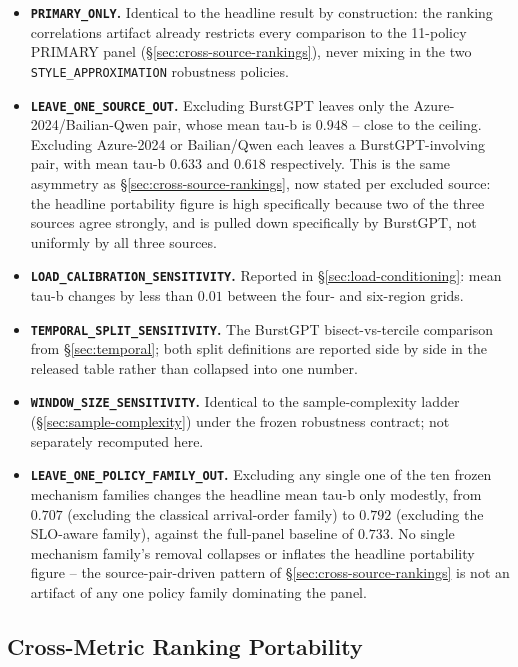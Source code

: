 \documentclass[sn-basic,Numbered,pdflatex]{sn-jnl}
\begin{document}
\begin{itemize}
  \item \textbf{\texttt{PRIMARY\_ONLY}.} Identical to the headline result
    by construction: the ranking correlations artifact already restricts
    every comparison to the 11-policy PRIMARY panel
    (\S\ref{sec:cross-source-rankings}), never mixing in the two
    \texttt{STYLE\_APPROXIMATION} robustness policies.
  \item \textbf{\texttt{LEAVE\_ONE\_SOURCE\_OUT}.} Excluding BurstGPT
    leaves only the Azure-2024/Bailian-Qwen pair, whose mean tau-b is
    $0.948$ -- close to the ceiling. Excluding Azure-2024 or Bailian/Qwen
    each leaves a BurstGPT-involving pair, with mean tau-b $0.633$ and
    $0.618$ respectively. This is the same asymmetry as
    \S\ref{sec:cross-source-rankings}, now stated per excluded source: the
    headline portability figure is high specifically because two of the
    three sources agree strongly, and is pulled down specifically by
    BurstGPT, not uniformly by all three sources.
  \item \textbf{\texttt{LOAD\_CALIBRATION\_SENSITIVITY}.} Reported in
    \S\ref{sec:load-conditioning}: mean tau-b changes by less than $0.01$
    between the four- and six-region grids.
  \item \textbf{\texttt{TEMPORAL\_SPLIT\_SENSITIVITY}.} The BurstGPT
    bisect-vs-tercile comparison from \S\ref{sec:temporal}; both split
    definitions are reported side by side in the released table rather
    than collapsed into one number.
  \item \textbf{\texttt{WINDOW\_SIZE\_SENSITIVITY}.} Identical to the
    sample-complexity ladder (\S\ref{sec:sample-complexity}) under the
    frozen robustness contract; not separately recomputed here.
  \item \textbf{\texttt{LEAVE\_ONE\_POLICY\_FAMILY\_OUT}.} Excluding any
    single one of the ten frozen mechanism families changes the headline
    mean tau-b only modestly, from $0.707$ (excluding the classical
    arrival-order family) to $0.792$ (excluding the SLO-aware family),
    against the full-panel baseline of $0.733$. No single mechanism
    family's removal collapses or inflates the headline portability
    figure -- the source-pair-driven pattern of
    \S\ref{sec:cross-source-rankings} is not an artifact of any one
    policy family dominating the panel.
\end{itemize}

\subsection{Cross-Metric Ranking Portability}
\label{sec:results-cross-metric}
\end{document}
